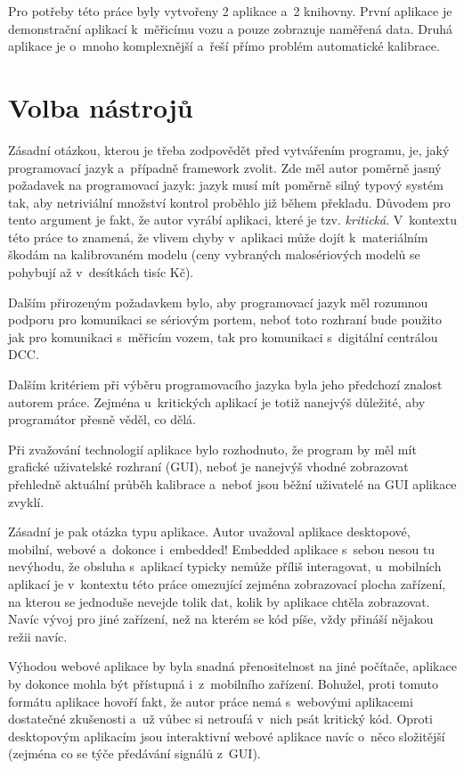 Pro potřeby této práce byly vytvořeny 2 aplikace a~2 knihovny. První aplikace
je demonstrační aplikací k~měřicímu vozu a pouze zobrazuje naměřená data. Druhá
aplikace je o~mnoho komplexnější a~řeší přímo problém automatické kalibrace.

\section{Volba nástrojů}
\label{sec:sw-nastroje}

Zásadní otázkou, kterou je třeba zodpovědět před vytvářením programu, je,
jaký programovací jazyk a~případně framework zvolit. Zde měl autor poměrně
jasný požadavek na programovací jazyk: jazyk musí mít poměrně silný typový
systém tak, aby netriviální množství kontrol proběhlo již během překladu.
Důvodem pro tento argument je fakt, že autor vyrábí aplikaci, které je tzv.
\textit{kritická}. V~kontextu této práce to znamená, že vlivem chyby
v~aplikaci může dojít k~materiálním škodám na kalibrovaném modelu (ceny
vybraných malosériových modelů se pohybují až v~desítkách tisíc Kč).

Dalším přirozeným požadavkem bylo, aby programovací jazyk měl rozumnou podporu
pro komunikaci se sériovým portem, neboť toto rozhraní bude použito jak pro
komunikaci s~měřicím vozem, tak pro komunikaci s~digitální centrálou \gls{DCC}.

Dalším kritériem při výběru programovacího jazyka byla jeho předchozí znalost
autorem práce. Zejména u~kritických aplikací je totiž nanejvýš důležité, aby
programátor přesně věděl, co dělá.

Při zvažování technologií aplikace bylo rozhodnuto, že program by měl
mít grafické uživatelské rozhraní (GUI), neboť je nanejvýš vhodné zobrazovat
přehledně aktuální průběh kalibrace a~neboť jsou běžní uživatelé na GUI
aplikace zvyklí.

Zásadní je pak otázka typu aplikace. Autor uvažoval aplikace desktopové,
mobilní, webové a~dokonce i~embedded! Embedded aplikace s~sebou nesou tu
nevýhodu, že obsluha s~aplikací typicky nemůže příliš interagovat, u~mobilních
aplikací je v~kontextu této práce omezující zejména zobrazovací plocha
zařízení, na kterou se jednoduše nevejde tolik dat, kolik by aplikace chtěla
zobrazovat. Navíc vývoj pro jiné zařízení, než na kterém se kód píše, vždy
přináší nějakou režii navíc.

Výhodou webové aplikace by byla snadná přenositelnost na jiné počítače,
aplikace by dokonce mohla být přístupná i~z~mobilního zařízení. Bohužel, proti
tomuto formátu aplikace hovoří fakt, že autor práce nemá s~webovými aplikacemi
dostatečné zkušenosti a~už vůbec si netroufá v~nich psát kritický kód.
Oproti desktopovým aplikacím jsou interaktivní webové aplikace navíc o~něco
složitější (zejména co se týče předávání signálů z~GUI).

